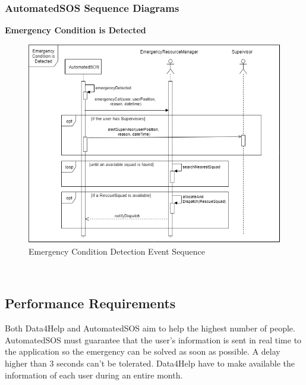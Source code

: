 {\color{Blue}\subsubsection{AutomatedSOS Sequence Diagrams}}

\textbf{Emergency Condition is Detected}\par
\begin{figure}[H]
	\includegraphics[scale=0.9]{Images/UML/EmergencyConditionsSeq.png}
	\captionsetup{justification=raggedright, singlelinecheck=false}
	\vspace*{-2mm}\caption{Emergency Condition Detection Event Sequence}
	\label{figure16}
\end{figure}
\newpage







\
{\color{Blue}\subsection{Performance Requirements}}

Both Data4Help and AutomatedSOS aim to help the highest number of people. AutomatedSOS must guarantee that the user's information is sent in real time to the application so the emergency can be solved as soon as possible. A delay higher than 3 seconds can’t be tolerated. Data4Help have to make available the information of each user during an entire month.
